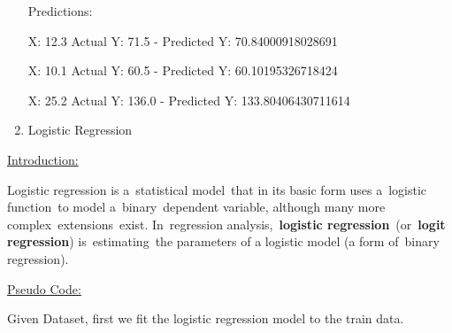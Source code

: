 \documentclass[12pt]{article}
\renewcommand{\_}{\kern-1.5pt\textunderscore\kern-1.5pt}
\begin{document}
\begin{enumerate}
\textcolor[HTML]{222222}{Predictions:}\par

\textcolor[HTML]{222222}{X: 12.3 Actual Y: 71.5 - Predicted Y: 70.84000918028691}\par

\textcolor[HTML]{222222}{X: 10.1 Actual Y: 60.5 - Predicted Y: 60.10195326718424}\par

\textcolor[HTML]{222222}{X: 25.2 Actual Y: 136.0 - Predicted Y: 133.80406430711614}\par


\vspace{\baselineskip}

\vspace{\baselineskip}

\vspace{\baselineskip}

\vspace{\baselineskip}

\vspace{\baselineskip}
	\item {\fontsize{20pt}{24.0pt}\selectfont \textcolor[HTML]{222222}{Logistic Regression}\par}
\end{enumerate}\par

{\fontsize{14pt}{16.8pt}\selectfont \textcolor[HTML]{222222}{\uline{Introduction:}}\par}\par

\textcolor[HTML]{202122}{Logistic regression is a }statistical model\textcolor[HTML]{202122}{ that in its basic form uses a }logistic function\textcolor[HTML]{202122}{ to model a }binary\textcolor[HTML]{202122}{ }dependent variable\textcolor[HTML]{202122}{, although many more complex }extensions\textcolor[HTML]{202122}{ exist. In }regression analysis\textcolor[HTML]{202122}{, \textbf{logistic regression} (or \textbf{logit regression}) is }estimating\textcolor[HTML]{202122}{ the parameters of a logistic model (a form of }binary regression\textcolor[HTML]{202122}{).}\par

{\fontsize{14pt}{16.8pt}\selectfont \textcolor[HTML]{202122}{\uline{Pseudo Code:}}\par}\par

\textcolor[HTML]{202122}{Given Dataset, first we fit the logistic regression model to the train data.}\par
\end{document}
